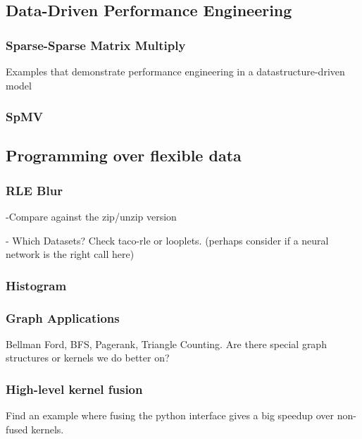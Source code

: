 \documentclass{article}
\begin{document}
\subsection{Data-Driven Performance Engineering}
\subsubsection{Sparse-Sparse Matrix Multiply}
Examples that demonstrate performance engineering in a datastructure-driven model

\subsubsection{SpMV}


\subsection{Programming over flexible data}

\subsubsection{RLE Blur}

-Compare against the zip/unzip version

- Which Datasets? Check taco-rle or looplets.
(perhaps consider if a neural network is the right call here)

\subsubsection{Histogram}


\subsubsection{Graph Applications}
Bellman Ford, BFS, Pagerank, Triangle Counting.
	Are there special graph structures or kernels we do better on?

\subsubsection{High-level kernel fusion}
Find an example where fusing the python interface gives a big speedup over non-fused kernels.



\end{document}

